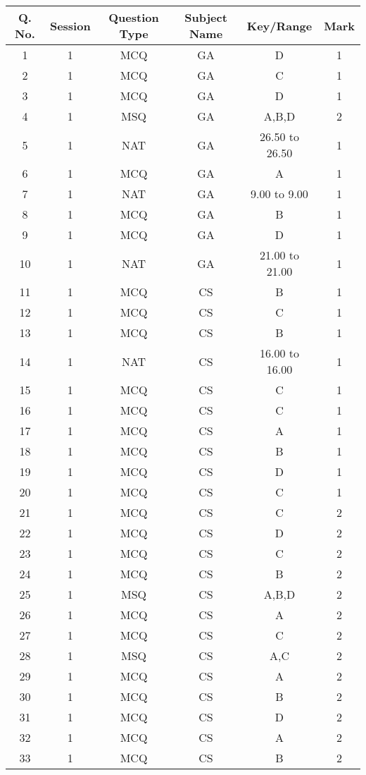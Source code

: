 \begin{table}[h!]
\centering
\begin{tabular}{|c|c|c|c|c|c|}
\hline
Q. No. & Session & Question Type & Subject Name & Key/Range & Mark \\
\hline
1  & 1 & MCQ & GA & D & 1 \\
2  & 1 & MCQ & GA & C & 1 \\
3  & 1 & MCQ & GA & D & 1 \\
4  & 1 & MSQ & GA & A,B,D & 2 \\
5  & 1 & NAT & GA & 26.50 to 26.50 & 1 \\
6  & 1 & MCQ & GA & A & 1 \\
7  & 1 & NAT & GA & 9.00 to 9.00 & 1 \\
8  & 1 & MCQ & GA & B & 1 \\
9  & 1 & MCQ & GA & D & 1 \\
10 & 1 & NAT & GA & 21.00 to 21.00 & 1 \\
11 & 1 & MCQ & CS & B & 1 \\
12 & 1 & MCQ & CS & C & 1 \\
13 & 1 & MCQ & CS & B & 1 \\
14 & 1 & NAT & CS & 16.00 to 16.00 & 1 \\
15 & 1 & MCQ & CS & C & 1 \\
16 & 1 & MCQ & CS & C & 1 \\
17 & 1 & MCQ & CS & A & 1 \\
18 & 1 & MCQ & CS & B & 1 \\
19 & 1 & MCQ & CS & D & 1 \\
20 & 1 & MCQ & CS & C & 1 \\
21 & 1 & MCQ & CS & C & 2 \\
22 & 1 & MCQ & CS & D & 2 \\
23 & 1 & MCQ & CS & C & 2 \\
24 & 1 & MCQ & CS & B & 2 \\
25 & 1 & MSQ & CS & A,B,D & 2 \\
26 & 1 & MCQ & CS & A & 2 \\
27 & 1 & MCQ & CS & C & 2 \\
28 & 1 & MSQ & CS & A,C & 2 \\
29 & 1 & MCQ & CS & A & 2 \\
30 & 1 & MCQ & CS & B & 2 \\
31 & 1 & MCQ & CS & D & 2 \\
32 & 1 & MCQ & CS & A & 2 \\
33 & 1 & MCQ & CS & B & 2 \\

\end{tabular}
\end{table}
